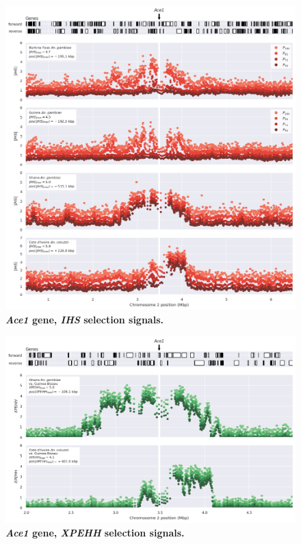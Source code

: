 \documentclass[a4paper,11pt,abstracton,hidelinks]{scrartcl}
\begin{document}
\begin{figure}[t!]
	\begin{center}
		\includegraphics*[width=1.1\linewidth,center]{artwork/locus_ace1_ihs.png}
	\end{center}
	\caption[\textit{Ace1} gene, \textit{IHS} selection signals]{
	\textbf{\textit{Ace1} gene, \textit{IHS} selection signals.}
	} 
	\label{fig:locus_ace1_ihs}
\end{figure}


\clearpage


\begin{figure}[t!]
	\begin{center}
		\includegraphics*[width=1.1\linewidth,center]{artwork/locus_ace1_xpehh.png}
	\end{center}
	\caption[\textit{Ace1} gene, \textit{XPEHH} selection signals]{
	\textbf{\textit{Ace1} gene, \textit{XPEHH} selection signals.}
	} 
	\label{fig:locus_ace1_xpehh}
\end{figure}
\end{document}
